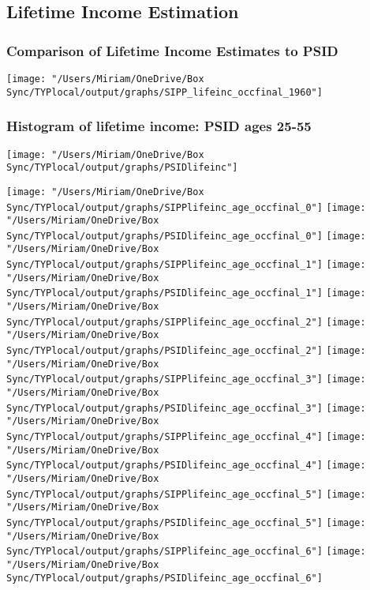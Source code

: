 \documentclass[12pt]{article}
\begin{document}
\subsection{Lifetime Income Estimation}
\subsubsection{Comparison of Lifetime Income Estimates to PSID}

\texttt{[image: "/Users/Miriam/OneDrive/Box Sync/TYPlocal/output/graphs/SIPP\_lifeinc\_occfinal\_1960"]}
\subsubsection{Histogram of lifetime income: PSID ages 25-55}
\texttt{[image: "/Users/Miriam/OneDrive/Box Sync/TYPlocal/output/graphs/PSIDlifeinc"]}

\begin{center}
\clearpage
\texttt{[image: "/Users/Miriam/OneDrive/Box Sync/TYPlocal/output/graphs/SIPPlifeinc\_age\_occfinal\_0"]}
\newline
\texttt{[image: "/Users/Miriam/OneDrive/Box Sync/TYPlocal/output/graphs/PSIDlifeinc\_age\_occfinal\_0"]}
\clearpage
\texttt{[image: "/Users/Miriam/OneDrive/Box Sync/TYPlocal/output/graphs/SIPPlifeinc\_age\_occfinal\_1"]}
\newline
\texttt{[image: "/Users/Miriam/OneDrive/Box Sync/TYPlocal/output/graphs/PSIDlifeinc\_age\_occfinal\_1"]}
\clearpage
\texttt{[image: "/Users/Miriam/OneDrive/Box Sync/TYPlocal/output/graphs/SIPPlifeinc\_age\_occfinal\_2"]}
\newline
\texttt{[image: "/Users/Miriam/OneDrive/Box Sync/TYPlocal/output/graphs/PSIDlifeinc\_age\_occfinal\_2"]}
\clearpage
\texttt{[image: "/Users/Miriam/OneDrive/Box Sync/TYPlocal/output/graphs/SIPPlifeinc\_age\_occfinal\_3"]}
\newline
\texttt{[image: "/Users/Miriam/OneDrive/Box Sync/TYPlocal/output/graphs/PSIDlifeinc\_age\_occfinal\_3"]}
\clearpage
\texttt{[image: "/Users/Miriam/OneDrive/Box Sync/TYPlocal/output/graphs/SIPPlifeinc\_age\_occfinal\_4"]}
\newline
\texttt{[image: "/Users/Miriam/OneDrive/Box Sync/TYPlocal/output/graphs/PSIDlifeinc\_age\_occfinal\_4"]}
\clearpage
\texttt{[image: "/Users/Miriam/OneDrive/Box Sync/TYPlocal/output/graphs/SIPPlifeinc\_age\_occfinal\_5"]}
\newline
\texttt{[image: "/Users/Miriam/OneDrive/Box Sync/TYPlocal/output/graphs/PSIDlifeinc\_age\_occfinal\_5"]}
\clearpage
\texttt{[image: "/Users/Miriam/OneDrive/Box Sync/TYPlocal/output/graphs/SIPPlifeinc\_age\_occfinal\_6"]}
\newline
\texttt{[image: "/Users/Miriam/OneDrive/Box Sync/TYPlocal/output/graphs/PSIDlifeinc\_age\_occfinal\_6"]}
\clearpage
\end{center}
\end{document}
